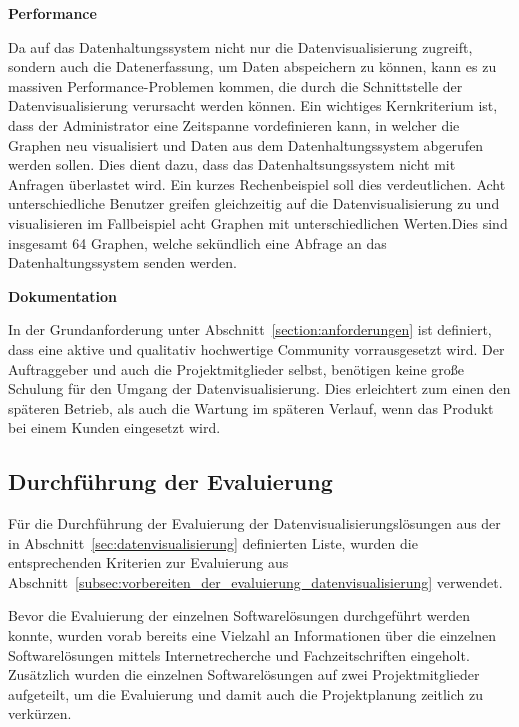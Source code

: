 \textbf{Performance}
\begin{outline}
  \1 Da auf das Datenhaltungssystem nicht nur die Datenvisualisierung zugreift,
  sondern auch die Datenerfassung, um Daten abspeichern zu können, kann es zu
  massiven Performance\hyp{}Problemen kommen, die durch die Schnittstelle der
  Datenvisualisierung verursacht werden können. Ein wichtiges Kernkriterium
  ist, dass der Administrator eine Zeitspanne vordefinieren kann, in welcher
  die Graphen neu visualisiert und Daten aus dem Datenhaltungssystem abgerufen
  werden sollen. Dies dient dazu, dass das Datenhaltsungssystem nicht mit
  Anfragen überlastet wird. Ein kurzes Rechenbeispiel soll dies verdeutlichen.
  Acht unterschiedliche Benutzer greifen gleichzeitig auf die
  Datenvisualisierung zu und visualisieren im Fallbeispiel acht Graphen mit
  unterschiedlichen Werten.Dies sind insgesamt 64 Graphen, welche sekündlich
  eine Abfrage an das Datenhaltungssystem senden werden.
\end{outline}

\textbf{Dokumentation}
\begin{outline}
  \1  In der Grundanforderung unter Abschnitt~\ref{section:anforderungen} ist
  definiert, dass eine aktive und qualitativ hochwertige Community
  vorrausgesetzt wird. Der Auftraggeber und auch die Projektmitglieder selbst,
  benötigen keine große Schulung für den Umgang der Datenvisualisierung. Dies
  erleichtert zum einen den späteren Betrieb, als auch die Wartung im späteren
  Verlauf, wenn das Produkt bei einem Kunden eingesetzt wird.
\end{outline}
\mr%

\subsection{Durchführung der Evaluierung}
\label{subsec:durchfuehrung_evaluierung_datenvisualisierung}
Für die Durchführung der Evaluierung der Datenvisualisierungslösungen aus der
in Abschnitt~\ref{sec:datenvisualisierung} definierten Liste, wurden die
entsprechenden Kriterien zur Evaluierung aus
Abschnitt~\ref{subsec:vorbereiten_der_evaluierung_datenvisualisierung}
verwendet.

Bevor die Evaluierung der einzelnen Softwarelösungen durchgeführt werden
konnte, wurden vorab bereits eine Vielzahl an Informationen über die einzelnen
Softwarelösungen mittels Internetrecherche und Fachzeitschriften eingeholt.
Zusätzlich wurden die einzelnen Softwarelösungen auf zwei Projektmitglieder
aufgeteilt, um die Evaluierung und damit auch die Projektplanung zeitlich zu
verkürzen.

